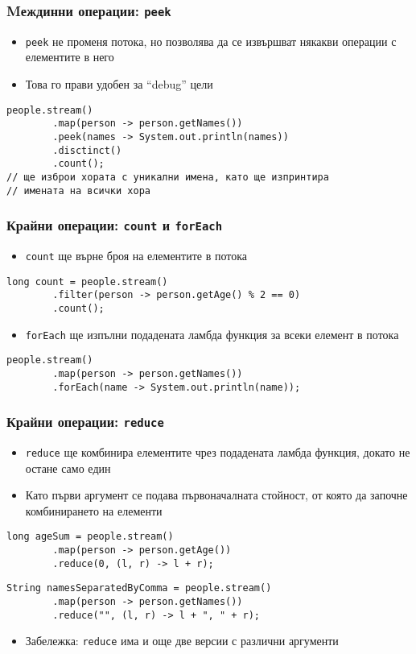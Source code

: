 \documentclass[ignorenonframetext, hyperref=unicode,compress,pdflatex]{beamer}
\begin{document}
\begin{frame}[containsverbatim]\frametitle{Mеждинни операции:
\lstinline{peek}}
\begin{itemize}
  \item \lstinline{peek} не променя потока, но позволява да се извършват някакви
  операции с елементите в него
  \item Това го прави удобен за ``debug'' цели
\end{itemize}
\begin{lstlisting}
people.stream()
		.map(person -> person.getNames())
		.peek(names -> System.out.println(names))
		.disctinct()
		.count();
// ще изброи хората с уникални имена, като ще изпринтира
// имената на всички хора
\end{lstlisting}
\end{frame}

\begin{frame}[containsverbatim]\frametitle{Крайни операции:
\lstinline{count} и \lstinline{forEach}}
\begin{itemize}
  \item \lstinline{count} ще върне броя на елементите в потока
\end{itemize}
\begin{lstlisting}
long count = people.stream()
		.filter(person -> person.getAge() % 2 == 0)
		.count();
\end{lstlisting}
\begin{itemize}
  \item \lstinline{forEach} ще изпълни подадената ламбда функция за всеки
  елемент в потока
\end{itemize}
\begin{lstlisting}
people.stream()
		.map(person -> person.getNames())
		.forEach(name -> System.out.println(name));
\end{lstlisting}
\end{frame}

\begin{frame}[containsverbatim]\frametitle{Крайни операции:
\lstinline{reduce}}
\begin{itemize}
  \item \lstinline{reduce} ще комбинира елементите чрез подадената ламбда
  функция, докато не остане само един
  \item Като първи аргумент се подава първоначалната стойност, от която да
  започне комбинирането на елементи
\end{itemize}
\begin{lstlisting}
long ageSum = people.stream()
		.map(person -> person.getAge())
		.reduce(0, (l, r) -> l + r);
\end{lstlisting}
\begin{lstlisting}
String namesSeparatedByComma = people.stream()
		.map(person -> person.getNames())
		.reduce("", (l, r) -> l + ", " + r);
\end{lstlisting}
\begin{itemize}
  \item Забележка: \lstinline{reduce} има и още две версии с различни аргументи
\end{itemize}
\end{frame}
\end{document}
